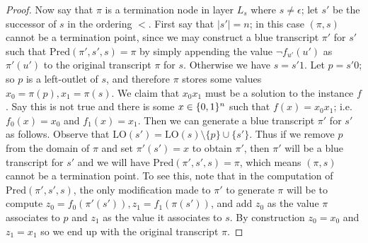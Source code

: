 \begin{proof}
Now say that $\pi$ is a termination node in layer $L_s$ where $s \neq \epsilon$; let $s'$ be the successor of $s$ in the ordering $<$. First say that $|s'|=n$; in this case $(\pi, s)$ cannot be a termination point, since we may construct a blue transcript $\pi'$ for $s'$ such that $\mathrm{Pred}(\pi',s',s)=\pi$ by simply appending the value $\lnot f_{u'}(u')$ as $\pi'(u')$ to the original transcript $\pi$ for $s$. Otherwise we have $s=s'1$. Let $p=s'0$; so $p$ is a left-outlet of $s$, and therefore $\pi$ stores some values $x_0 = \pi(p), x_1 = \pi(s)$. We claim that $x_0x_1$ must be a solution to the \avoid instance $f$. Say this is not true and there is some $x \in \{0,1\}^n$ such that $f(x)=x_0x_1$; i.e. $f_0(x)=x_0$ and $f_1(x)=x_1$. Then we can generate a blue transcript $\pi'$ for $s'$ as follows. Observe that $\mathrm{LO}(s') = \mathrm{LO}(s) \setminus \{p\} \cup \{s'\}$. Thus if we remove $p$ from the domain of $\pi$ and set $\pi'(s') = x$ to obtain $\pi'$, then $\pi'$ will be a blue transcript for $s'$ and we will have $\mathrm{Pred}(\pi',s',s)=\pi$, which means $(\pi, s)$ cannot be a termination point. To see this, note that in the computation of $\mathrm{Pred}(\pi',s',s)$, the only modification made to $\pi'$ to generate $\pi$ will be to compute $z_0 =f_0(\pi'(s')), z_1 = f_1(\pi(s'))$, and add $z_0$ as the value $\pi$ associates to $p$ and $z_1$ as the value it associates to $s$. By construction $z_0 = x_0$ and $z_1=x_1$ so we end up with the original transcript $\pi$.

\end{proof}

